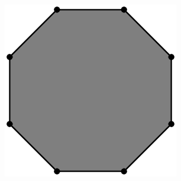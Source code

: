 \documentclass{article}
\begin{document}
\begin{enumerate}[resume]
\begin{center}
            \includegraphics[scale=0.25]{octagon.png}
        \end{center}
\end{enumerate}
\end{document}
